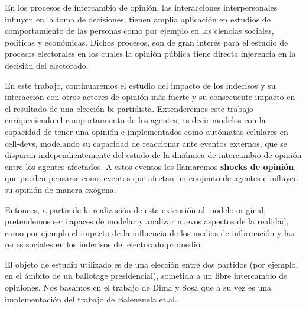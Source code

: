 En los procesos de intercambio de opinión, las interacciones interpersonales influyen en la toma de decisiones, tienen amplia aplicación en estudios de comportamiento de las personas como por ejemplo en las ciencias sociales, políticas y económicas. Dichos procesos, son de gran interés para el estudio de procesos electorales en los cuales la opinión pública tiene directa injerencia en la decisión del electorado.

En este trabajo, continuaremos el estudio del impacto de los indecisos y su
interacción con otros actores de opinión más fuerte y su consecuente impacto en
el resultado de una elección bi-partidista. Extenderemos este trabajo
enriqueciendo el comportamiento de los agentes, es decir modelos con la capacidad de tener una opinión e implementados como autómatas celulares en cell-devs, modelando su capacidad de reaccionar ante eventos externos,
que se disparan independientemente del estado de la dinámica de intercambio de
opinión entre los agentes afectados. A estos eventos los
llamaremos \textbf{shocks de opinión}, que pueden pensarse como eventos que
afectan un conjunto de agentes e influyen su opinión de manera exógena.

Entonces, a partir de la realización de esta extensión al modelo original, pretendemos ser capaces de modelar y analizar nuevos aspectos de la realidad, como por ejemplo el impacto de la influencia de los medios de información y las redes sociales en los indecisos del electorado promedio.

El objeto de estudio utilizado  es de una elección entre dos partidos (por ejemplo, en el ámbito de un ballotage presidencial), sometida a un libre intercambio de opiniones. Nos basamos en el trabajo de Dima y Sosa\cite{dina2015}  que a su vez es una implementación del trabajo de Balenzuela et.al\cite{balenzuela}.
